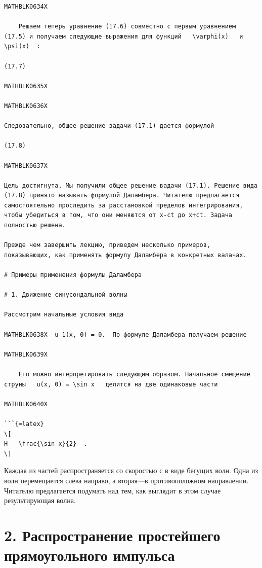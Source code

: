 \documentclass[
]{article}
\begin{document}
\begin{verbatim}
MATHBLK0634X

    Решаем теперь уравнение (17.6) совместно с первым уравнением (17.5) и получаем следующие выражения для функций   \varphi(x)   и   \psi(x)  :

(17.7)

MATHBLK0635X

MATHBLK0636X

Следовательно, общее решение задачи (17.1) дается формулой

(17.8)

MATHBLK0637X

Цель достигнута. Мы получили общее решение вадачи (17.1). Решение вида (17.8) принято называть формулой Даламбера. Читателю предлагается самостоятельно проследить за расстановкой пределов интегрирования, чтобы убедиться в том, что они меняются от x-ct до x+ct. Задача полностью решена.

Прежде чем завершить лекцию, приведем несколько примеров, показывающих, как применять формулу Даламбера в конкретных валачах.

# Примеры применения формулы Даламбера

# 1. Движение синусондальной волны

Рассмотрим начальные условия вида

MATHBLK0638X  u_1(x, 0) = 0.  По формуле Даламбера получаем решение

MATHBLK0639X

    Его можно интерпретировать следующим образом. Начальное смещение струны   u(x, 0) = \sin x   делится на две одинаковые части

MATHBLK0640X

```{=latex}
\[
H   \frac{\sin x}{2}  .
\]
\end{verbatim}

Каждая из частей распространяется со скоростью с в виде бегущих волн.
Одна из волн перемещается слева направо, а вторая---в противоположном
направлении. Читателю предлагается подумать над тем, как выглядит в этом
случае результирующая волна.

\section{2. Распространение простейшего прямоугольного
импульса}\label{ux440ux430ux441ux43fux440ux43eux441ux442ux440ux430ux43dux435ux43dux438ux435-ux43fux440ux43eux441ux442ux435ux439ux448ux435ux433ux43e-ux43fux440ux44fux43cux43eux443ux433ux43eux43bux44cux43dux43eux433ux43e-ux438ux43cux43fux443ux43bux44cux441ux430}
\end{document}
